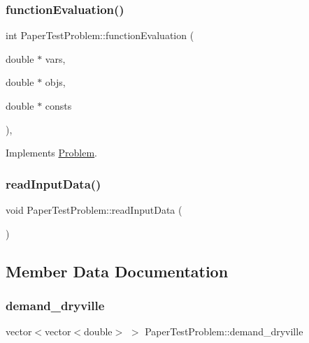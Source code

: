\subsubsection{\texorpdfstring{function\+Evaluation()}{functionEvaluation()}}
{\footnotesize\ttfamily int Paper\+Test\+Problem\+::function\+Evaluation (\begin{DoxyParamCaption}\item[{double $\ast$}]{vars,  }\item[{double $\ast$}]{objs,  }\item[{double $\ast$}]{consts }\end{DoxyParamCaption})\hspace{0.3cm}{\ttfamily [override]}, {\ttfamily [virtual]}}



Implements \mbox{\hyperlink{classProblem_acd924a80df4422c5199748c714e9405c}{Problem}}.

\mbox{\label{classPaperTestProblem_ae4bcc17d6ceab628f88174306d54fdc9}} 
\subsubsection{\texorpdfstring{read\+Input\+Data()}{readInputData()}}
{\footnotesize\ttfamily void Paper\+Test\+Problem\+::read\+Input\+Data (\begin{DoxyParamCaption}{ }\end{DoxyParamCaption})}



\subsection{Member Data Documentation}
\mbox{\label{classPaperTestProblem_a74c88139d65ef34aec2aa2111697c7be}} 
\subsubsection{\texorpdfstring{demand\+\_\+dryville}{demand\_dryville}}
{\footnotesize\ttfamily vector$<$vector$<$double$>$ $>$ Paper\+Test\+Problem\+::demand\+\_\+dryville\hspace{0.3cm}{\ttfamily [private]}}

